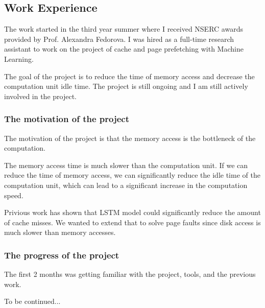 \documentclass[a4 paper, 10pt]{article}
\begin{document}
{\subsection*{Work Experience}
\label{prefetching}
The work started in the third year summer where I received NSERC awards provided by Prof. Alexandra Fedorova. I was hired as a full-time research assistant to work on the project of cache and page prefetching with Machine Learning. 

The goal of the project is to reduce the time of memory access and decrease the computation unit idle time. The project is still ongoing and I am still actively involved in the project.

\subsubsection*{The motivation of the project}
The motivation of the project is that the memory access is the bottleneck of the computation.

The memory access time is much slower than the computation unit. If we can reduce the time of memory access, we can significantly reduce the idle time of the computation unit, which can lead to a significant increase in the computation speed.

Privious work has shown that LSTM model could significantly reduce the amount of cache misses. We wanted to extend that to solve page faults since disk access is much slower than memory accesses.

\subsubsection*{The progress of the project}
The first 2 months was getting familiar with the project, tools, and the previous work. 

To be continued...

}
\end{document}
